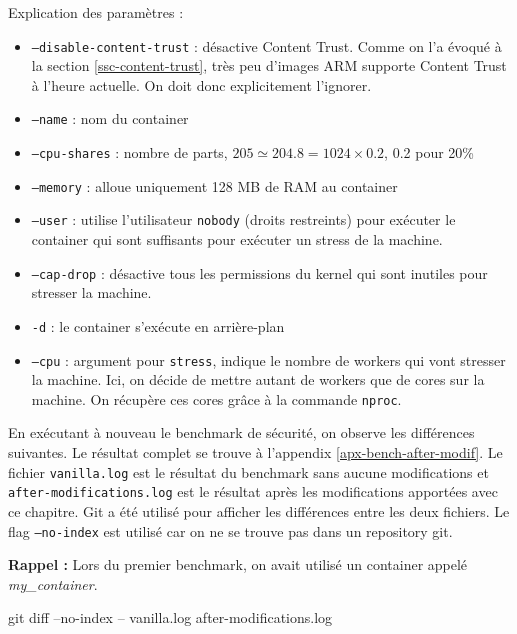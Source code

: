 \documentclass[11pt,a4paper,oneside]{report}
\newcommand{\code}[1]{\texttt{#1}}
\begin{document}
Explication des paramètres :
\begin{itemize}
\item \code{--disable-content-trust} : désactive Content Trust. Comme on l'a évoqué à la section \ref{ssc-content-trust}, très peu d'images ARM supporte Content Trust à l'heure actuelle. On doit donc explicitement l'ignorer.
\item \code{--name} : nom du container
\item \code{--cpu-shares} : nombre de parts, $205 \simeq 204.8 = 1024 \times 0.2$, 0.2 pour 20\%
\item \code{--memory} : alloue uniquement 128 MB de RAM au container
\item \code{--user} : utilise l'utilisateur \code{nobody} (droits restreints) pour exécuter le container qui sont suffisants pour exécuter un stress de la machine.
\item \code{--cap-drop} : désactive tous les permissions du kernel qui sont inutiles pour stresser la machine.
\item \code{-d} : le container s'exécute en arrière-plan
\item \code{--cpu} : argument pour \code{stress}, indique le nombre de workers qui vont stresser la machine. Ici, on décide de mettre autant de workers que de cores sur la machine. On récupère ces cores grâce à la commande \code{nproc}.
\end{itemize}

En exécutant à nouveau le benchmark de sécurité, on observe les différences suivantes. Le résultat complet se trouve à l'appendix \ref{apx-bench-after-modif}. Le fichier \code{vanilla.log} est le résultat du benchmark sans aucune modifications et \code{after-modifications.log} est le résultat après les modifications apportées avec ce chapitre. Git a été utilisé pour afficher les différences entre les deux fichiers. Le flag \code{--no-index} est utilisé car on ne se trouve pas dans un repository git.

\textbf{Rappel :} Lors du premier benchmark, on avait utilisé un container appelé \textit{my\_container}.

\begin{bashcode}
git diff --no-index -- vanilla.log after-modifications.log
\end{bashcode}

\inputminted[xleftmargin=20pt, linenos=true, breaklines=true, frame=single, framesep=6pt, tabsize=2, fontfamily=courier, fontsize=\small]{diff}{../../docker_security_benchmark/diff.log}
\end{document}
